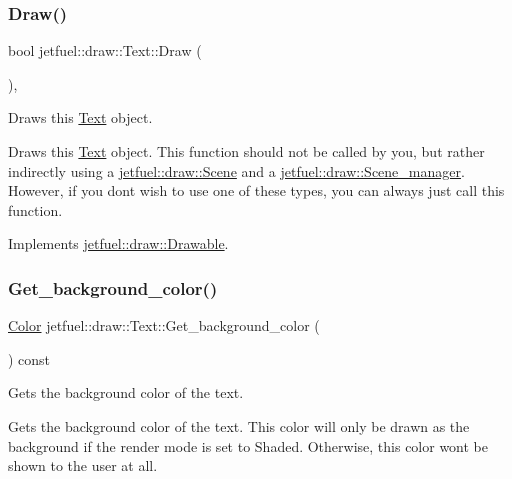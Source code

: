 \subsubsection{\texorpdfstring{Draw()}{Draw()}}
{\footnotesize\ttfamily bool jetfuel\+::draw\+::\+Text\+::\+Draw (\begin{DoxyParamCaption}{ }\end{DoxyParamCaption})\hspace{0.3cm}{\ttfamily [override]}, {\ttfamily [virtual]}}



Draws this \hyperlink{classjetfuel_1_1draw_1_1Text}{Text} object. 

Draws this \hyperlink{classjetfuel_1_1draw_1_1Text}{Text} object. This function should not be called by you, but rather indirectly using a \hyperlink{classjetfuel_1_1draw_1_1Scene}{jetfuel\+::draw\+::\+Scene} and a \hyperlink{classjetfuel_1_1draw_1_1Scene__manager}{jetfuel\+::draw\+::\+Scene\+\_\+manager}. However, if you don\textquotesingle{}t wish to use one of these types, you can always just call this function. 

Implements \hyperlink{classjetfuel_1_1draw_1_1Drawable_a1a072070322965ce9411ee6e7c311c56}{jetfuel\+::draw\+::\+Drawable}.

\mbox{\label{classjetfuel_1_1draw_1_1Text_a47ce107c33da03675d39e7550f7c44fc}} 
\subsubsection{\texorpdfstring{Get\+\_\+background\+\_\+color()}{Get\_background\_color()}}
{\footnotesize\ttfamily \hyperlink{classjetfuel_1_1draw_1_1Color}{Color} jetfuel\+::draw\+::\+Text\+::\+Get\+\_\+background\+\_\+color (\begin{DoxyParamCaption}{ }\end{DoxyParamCaption}) const\hspace{0.3cm}{\ttfamily [inline]}}



Gets the background color of the text. 

Gets the background color of the text. This color will only be drawn as the background if the render mode is set to Shaded. Otherwise, this color won\textquotesingle{}t be shown to the user at all. \mbox{\label{classjetfuel_1_1draw_1_1Text_af9719fdfc0d04106843a69674df3d2c7}} 
